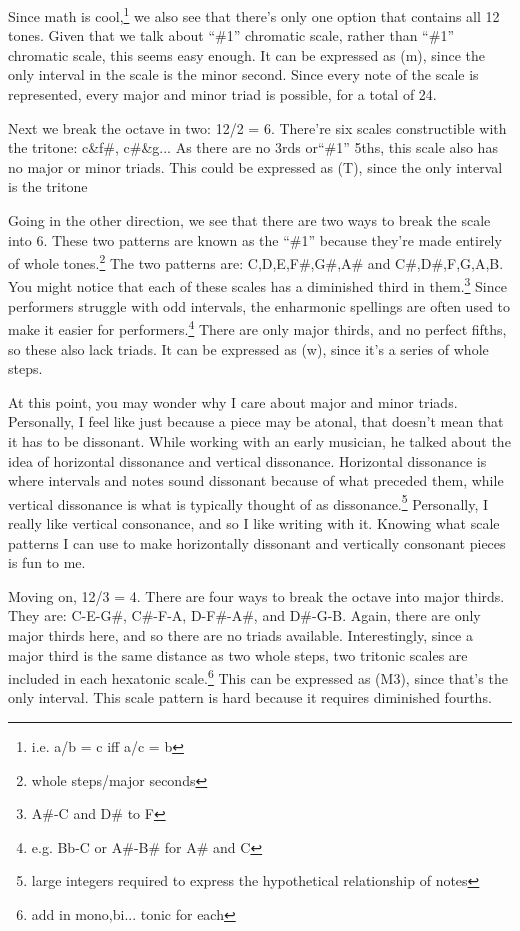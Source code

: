 \documentclass[12pt]{article}[titlepage]
\newcommand{\say}[1]{``\#1''}
\newcommand{\1}{\={a}}
\newcommand{\2}{\={e}}
\newcommand{\3}{\={\i}}
\newcommand{\4}{\=o}
\newcommand{\5}{\=u}
\newcommand{\6}{\={A}}
\renewcommand{\,}{\textsuperscript{,}}
\begin{document}
Since math is cool,\footnote{i.e. a/b = c iff a/c = b} we also see that there's only one option that contains all 12 tones.
Given that we talk about \say{the} chromatic scale, rather than \say{a} chromatic scale, this seems easy enough.
It can be expressed as (m), since the only interval in the scale is the minor second.
Since every note of the scale is represented, every major and minor triad is possible, for a total of 24.

Next we break the octave in two: 12/2 = 6.
There're six scales constructible with the tritone: c\&f\#, c\#\&g...
As there are no 3rds or\say{perfect} 5ths, this scale also has no major or minor triads.
This could be expressed as (T), since the only interval is the tritone

Going in the other direction, we see that there are two ways to break the scale into 6.
These two patterns are known as the \say{whole tone scale,} because they're made entirely of whole tones.\footnote{whole steps/major seconds}
The two patterns are: C,D,E,F\#,G\#,A\# and C\#,D\#,F,G,A,B.
You might notice that each of these scales has a diminished third in them.\footnote{A\#-C and D\# to F}
Since performers struggle with odd intervals, the enharmonic spellings are often used to make it easier for performers.\footnote{e.g. Bb-C or A\#-B\# for A\# and C}
There are only major thirds, and no perfect fifths, so these also lack triads.
It can be expressed as (w), since it's a series of whole steps.

At this point, you may wonder why I care about major and minor triads.
Personally, I feel like just because a piece may be atonal, that doesn't mean that it has to be dissonant.
While working with an early musician, he talked about the idea of horizontal dissonance and vertical dissonance.
Horizontal dissonance is where intervals and notes sound dissonant because of what preceded them, while vertical dissonance is what is typically thought of as dissonance.\footnote{large integers required to express the hypothetical relationship of notes}
Personally, I really like vertical consonance, and so I like writing with it.
Knowing what scale patterns I can use to make horizontally dissonant and vertically consonant pieces is fun to me.

Moving on, 12/3 = 4.
There are four ways to break the octave into major thirds.
They are: C-E-G\#, C\#-F-A, D-F\#-A\#, and D\#-G-B.
Again, there are only major thirds here, and so there are no triads available.
Interestingly, since a major third is the same distance as two whole steps, two tritonic scales are included in each hexatonic scale.\footnote{add in mono,bi... tonic for each}
This can be expressed as (M3), since that's the only interval.
This scale pattern is hard because it requires diminished fourths.
\end{document}

